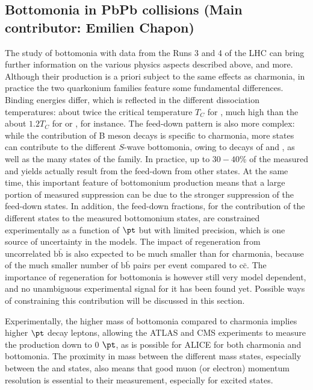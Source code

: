 \documentclass[../report.tex]{subfiles}
\begin{document}
\clearpage

\subsection{Bottomonia in PbPb collisions (Main contributor: Emilien Chapon)}


The study of bottomonia with \PbPb data from the Runs 3 and 4 of the LHC can bring further information on the various physics aspects described above, and more.
Although their production is a priori subject to the same effects as charmonia, in practice the two quarkonium families feature some fundamental differences.
Binding energies differ, which is reflected in the different dissociation temperatures: about twice the critical temperature $T_C$ for , much high than the about
$1.2 T_C$ for \PJgy or , for instance. The feed-down pattern is also more complex: while the contribution of B meson decays is specific to charmonia, more states can
contribute to the different $S$-wave bottomonia, owing to decays of  and , as well as the many states of the \PGcb family. In practice, up to $30-40$\% of the measured 
 and  yields actually result from the feed-down from other states. At the same time, this important feature of bottomonium production means that
a large portion of measured  suppression can be due to the stronger suppression of the feed-down states.
In addition, the feed-down fractions, for the contribution of the 
different states to the measured bottomonium states, are constrained experimentally as a function of $\pt$ but with limited precision, which is one source of uncertainty in the models.
The impact of regeneration from uncorrelated $\text{b}\bar{\text{b}}$ is also expected to be much smaller than for charmonia, because of the much smaller number of $\text{b}\bar{\text{b}}$
pairs per \PbPb event compared to $\text{c}\bar{\text{c}}$. The importance of regeneration for bottomonia is however still very model dependent, and no unambiguous experimental signal
for it has been found yet. Possible ways of constraining this contribution will be discussed in this section.

Experimentally, the higher mass of bottomonia compared to charmonia implies higher $\pt$ decay leptons, allowing the ATLAS and CMS experiments to measure the production down to 0 $\pt$,
as is possible for ALICE for both charmonia and bottomonia. The proximity in mass between the different mass states, especially between the  and  states, also 
means that good muon (or electron) momentum resolution is essential to their measurement, especially for excited states. 
\end{document}
